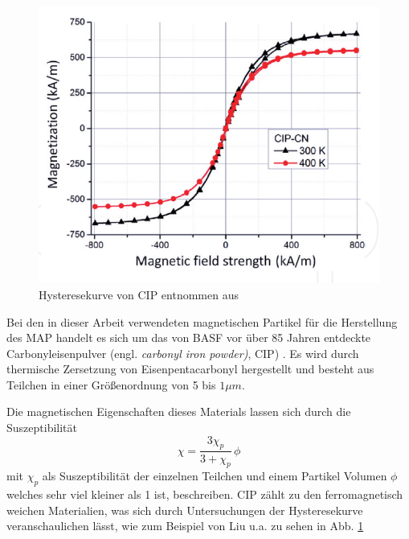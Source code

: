 \begin{figure}
	\centering
	\includegraphics[width=\linewidth]{Bilder/Hysterese.png}
	\caption{Hysteresekurve von CIP entnommen aus \cite[Abb.4]{Magnetorheological_Elastomers}}
	\label{Hysterese}
	\vspace{-0.6cm}
\end{figure}
Bei den in dieser Arbeit verwendeten magnetischen Partikel für die Herstellung des MAP handelt es sich um das von BASF vor über 85 Jahren entdeckte Carbonyleisenpulver (engl. \textit{carbonyl iron powder)}, CIP) \cite{basf_cip_allg}. 
Es wird durch thermische Zersetzung von Eisenpentacarbonyl hergestellt und besteht aus Teilchen in einer Größenordnung von 5 bis $1 \unit{\mu m}$.


Die magnetischen Eigenschaften dieses Materials lassen sich durch die Suszeptibilität \cite[Gleichung (2)]{Gorodkin}
\begin{equation}
	\chi = \frac{3 \chi_p}{3 + \chi_p} \,\phi
\end{equation}
mit $\chi_p$ als Suszeptibilität der einzelnen Teilchen und einem Partikel Volumen $\phi$ welches sehr viel kleiner als 1 ist, beschreiben. 
CIP zählt zu den ferromagnetisch weichen Materialien, was sich durch Untersuchungen der Hysteresekurve veranschaulichen lässt, wie zum Beispiel von Liu u.a. \cite{Magnetorheological_Elastomers} zu sehen in Abb. \ref{Hysterese}






